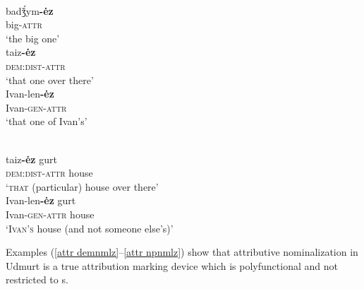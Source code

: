 \begin{exe}
\begin{xlist}
\\
\gll	badǯ́ym\textbf{-ėz}\\
	big-\textsc{attr}\\
\glt	 ‘the big one’
\\
\gll	taiz\textbf{-ėz}\\
 	\textsc{dem:dist}-\textsc{attr}\\
\glt	‘that one over there’
\\
\gll	Ivan-len\textbf{-ėz}\\
	Ivan-\textsc{gen}-\textsc{attr}\\
\glt	‘that one of Ivan's’
\end{xlist}
\begin{xlist}
\\ 
\label{attr demnmlz}
\gll	taiz\textbf{-ėz} gurt\\
 	\textsc{dem:dist}-\textsc{attr} house\\
\glt	‘\textsc{that} (particular) house over there’
\\ 
\label{attr npnmlz}
\gll	Ivan-len\textbf{-ėz} gurt\\
	Ivan-\textsc{gen}-\textsc{attr} house\\
\glt	‘\textsc{Ivan's} house (and not someone else's)’
\end{xlist}
\end{exe}
Examples (\ref{attr demnmlz}–\ref{attr npnmlz}) show that attributive nominalization in Udmurt is a true attribution marking device which is polyfunctional and not restricted to s.

